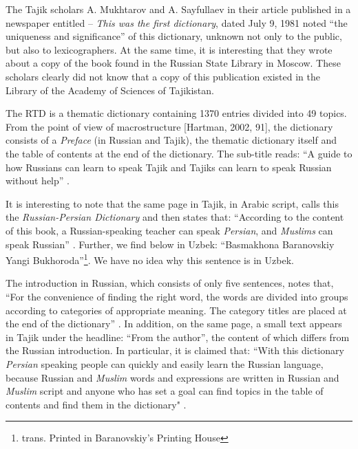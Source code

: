 \documentclass[output=paper,colorlinks,citecolor=brown,arabicfont,chinesefont]{langscibook}
\begin{document}
The Tajik scholars A. Mukhtarov and A. Sayfullaev in their article published in a newspaper entitled – \emph{This was the first dictionary}, dated July 9, 1981 noted “the uniqueness and significance” \citep[4]{MukhtorovSayfullaev1981} of this dictionary, unknown not only to the public, but also to lexicographers. At the same time, it is interesting that they wrote about a copy of the book found in the Russian State Library in Moscow. These scholars clearly did not know that a copy of this publication existed in the Library of the Academy of Sciences of Tajikistan. 

The RTD is a thematic dictionary containing 1370 entries divided into 49 topics. From the point of view of macrostructure [Hartman, 2002, 91], the dictionary consists of a \emph{Preface} (in Russian and Tajik), the thematic dictionary itself and the table of contents at the end of the dictionary. The sub-title reads: “A guide to how Russians can learn to speak Tajik and Tajiks can learn to speak Russian without help” \citep[1]{RTD}. 

It is interesting to note that the same page in Tajik, in Arabic script, calls this the \emph{Russian-Persian Dictionary} and then states that: “According to the content of this book, a Russian-speaking teacher can speak \emph{Persian}, and \emph{Muslims} can speak Russian” \citep[1]{RTD}. Further, we  find below in Uzbek: “Basmakhona Baranovskiy Yangi Bukhoroda”\footnote{trans. Printed in Baranovskiy’s Printing House}. We have no idea why this sentence is in Uzbek.

The introduction in Russian, which consists of only five sentences, notes that, “For the convenience of finding the right word, the words are divided into groups according to categories of appropriate meaning. The category titles are placed at the end of the dictionary” \citep[3]{RTD}. In addition, on the same page, a small text appears in Tajik under the headline: “From the author”, the content of which differs from the Russian introduction. In particular, it is claimed that: “With this dictionary \emph{Persian} speaking people can quickly and easily learn the Russian language, because Russian and \emph{Muslim} words and expressions are written in Russian and \emph{Muslim} script and anyone who has set a goal can find topics in the table of contents and find them in the dictionary" \citep[3]{RTD}.
\end{document}

